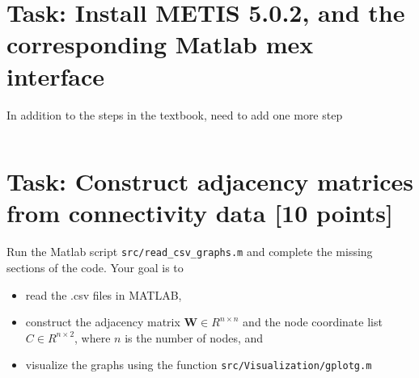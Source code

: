 \documentclass[unicode,11pt,a4paper,oneside,numbers=endperiod,openany]{scrartcl}
\begin{document}
\setassignment

\newline

\assignmentpolicy



\section{Task: Install METIS 5.0.2, and the corresponding Matlab mex interface}

In addition to the steps in the textbook,  need to add one more step
\begin{lstlisting}[language=MyBash, style=mystyle, caption={Remove Apple Quarantine Attribute}]
    % sudo xattr -d com.apple.quarantine
\end{lstlisting}


\section{Task:  Construct adjacency matrices
from connectivity data [10 points]}
    
Run the Matlab script
\texttt{src/read\_csv\_graphs.m} and complete
the
missing sections of the code. Your goal is to
\begin{itemize}
    \item read the .csv files in MATLAB,
    \item construct the adjacency matrix
    $\mathbf{W} \in R^{n\times n}$ and
    the node coordinate list $C \in
    R^{n\times 2}$, where $n$ is the number of nodes, and 
    \item visualize the graphs using the
    function
    \texttt{src/Visualization/gplotg.m}
\end{itemize}
\end{document}
